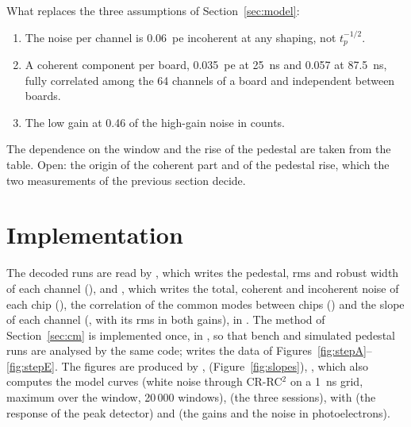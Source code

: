 \documentclass[11pt,a4paper]{article}
\begin{document}
What replaces the three assumptions of Section~\ref{sec:model}:
\begin{enumerate}
\item The noise per channel is 0.06~pe incoherent at any shaping, not $t_p^{-1/2}$.
\item A coherent component per board, 0.035~pe at 25~ns and 0.057 at 87.5~ns, fully
  correlated among the 64 channels of a board and independent between boards.
\item The low gain at 0.46 of the high-gain noise in counts.
\end{enumerate}
The dependence on the window and the rise of the pedestal are taken from the table. Open: the
origin of the coherent part and of the pedestal rise, which the two measurements of the
previous section decide.

\section*{Implementation}

The decoded runs are read by , which writes
the pedestal, rms and robust width of each channel (), and
, which writes the total, coherent and
incoherent noise of each chip (), the correlation of the common
modes between chips () and the slope of each channel
(, with its rms in both gains), in
. The method of Section~\ref{sec:cm} is implemented
once, in , so that bench and simulated pedestal runs
are analysed by the same code;  writes the data of
Figures~\ref{fig:stepA}--\ref{fig:stepE}. The figures are produced by
,  (Figure~\ref{fig:slopes}),
, which also computes the model curves (white noise through
CR-RC$^2$ on a 1~ns grid, maximum over the window, 20\,000 windows), 
(the three sessions),  with  (the response
of the peak detector) and  (the gains and the noise in photoelectrons).
\end{document}

